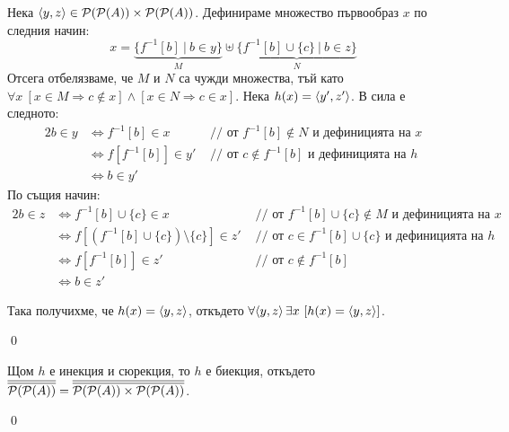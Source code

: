 \begin{tcolorbox}[mybox={Доказателство:}]
\quad
Нека $\langle y, z \rangle \in \mathcal{P}(\mathcal{P}(A)) \times \mathcal{P}(\mathcal{P}(A))$. Дефинираме множество първообраз $x$ по следния начин:
\[
x = \underbrace{\{f^{-1}[b]\ |\ b \in y\}}_{M} \uplus \underbrace{\{f^{-1}[b] \cup \{c\}\ |\ b \in z\}}_{N}
\]
\quad
Отсега отбелязваме, че $M$ и $N$ са чужди множества, тъй като
$\forall x\ [x \in M \Rightarrow c \notin x] \land [x \in N \Rightarrow c \in x]$.
Нека $h(x) = \langle y', z' \rangle$.
В сила е следното:
\begin{alignat*}{2}
b \in y & \iff f^{-1}[b] \in x      & \text{ // от $f^{-1}[b] \notin N$ и дефиницията на $x$} \\
        & \iff f[f^{-1}[b]] \in y'  & \text{ // от $c \notin f^{-1}[b]$ и дефиницията на $h$} \\
		& \iff b \in y'             &
\end{alignat*}
\quad
По същия начин:
\begin{alignat*}{2}
b \in z & \iff f^{-1}[b] \cup \{c\} \in x                         & \text{ // от $f^{-1}[b] \cup \{c\} \notin M$ и дефиницията на $x$} \\
        & \iff f[(f^{-1}[b] \cup \{c\}) \setminus \{c\}] \in z'   & \text{ // от $c \in f^{-1}[b] \cup \{c\}$ и дефиницията на $h$} \\
        & \iff f[f^{-1}[b]] \in z'                                & \text{ // от $c \notin f^{-1}[b]$} \\
		& \iff b \in z'                                           &
\end{alignat*}

\quad
Така получихме, че $h(x) = \langle y, z \rangle$, откъдето $\forall \langle y, z \rangle\, \exists x\ [h(x) = \langle y, z \rangle]$.

\qed
\end{tcolorbox}

\quad
Щом $h$ е инекция и сюрекция, то $h$ е биекция, откъдето
$\overline{\overline{\mathcal{P}(\mathcal{P}(A))}} = \overline{\overline{\mathcal{P}(\mathcal{P}(A)) \times \mathcal{P}(\mathcal{P}(A))}}$.

\qed




